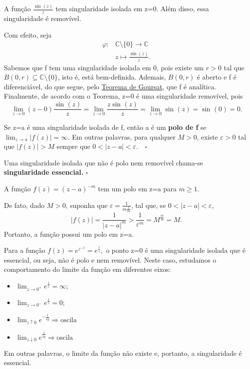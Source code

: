 \documentclass[ComplexAnalysis/complex.tex]{subfiles}
\begin{document}
\begin{example}
	A função \(\frac{\sin^{}{(z)}}{z}\) tem singularidade isolada em z=0. Além disso, essa singularidade é removível.

	Com efeito, seja
	\begin{align*}
		\varphi : & \mathbb{C}\setminus{\{0\}}\rightarrow \mathbb{C} \\
		          & z\mapsto \frac{\sin{(z)}}{z}.
	\end{align*}
	Sabemos que f tem uma singularidade isolada em 0, pois existe um \(r > 0\) tal que \(B(0, r)\subseteq \mathbb{C}\setminus{\{0\}}\), isto é, está bem-definida. Ademais, \(B(0, r)\) é aberto
	e f é diferenciável, do que segue, pelo \hyperlink{goursat}{Teorema de Goursat}, que f é analítica. Finalmente, de acordo com o Teorema, z=0 é uma singularidade removível, pois
	\[
		\lim_{z\to 0}(z-0)\frac{\sin^{}{(z)}}{z} = \lim_{z\to 0}\frac{z\sin^{}{(z)}}{z} = \lim_{z\to 0}\sin^{}{(z)} = \sin^{}{(0)} = 0.
	\]
\end{example}
\begin{def*}
	Se z=a é uma singularidade isolada de f, então a é um \textbf{polo de f} se \(\lim_{z\to a}|f(z)| = \infty.\) Em outras palavras,
	para qualquer \(M > 0\), existe \(\varepsilon > 0\) tal que \(|f(z)| > M\) sempre que \(0 < |z-a| < \varepsilon .\quad \square\)
\end{def*}
\begin{def*}
	Uma singularidade isolada que não é polo nem removível chama-se \textbf{singularidade essencial.} \(\square\)
\end{def*}
\begin{example}
	A função \(f(z) = (z-a)^{-m}\) tem um polo em z=a para \(m\geq 1\).

	De fato, dado \(M > 0\), suponha que \(\varepsilon  = \frac{1}{m \frac{1}{m}}\), tal que, se \(0 < |z-a| < \varepsilon ,\)
	\[
		|f(z)| = \frac{1}{|z-a|^{m}}> \frac{1}{\varepsilon ^{m}} = M^{\frac{m}{m}} = M.
	\]
	Portanto, a função possui um polo em z=a.
\end{example}
\begin{example}
	Para a função \(f(z) = e^{z^{-1}} = e^{\frac{1}{z}},\) o ponto z=0 é uma singularidade isolada que é essencial, ou seja, não é polo e nem removível. Neste caso, estudamos o comportamento do limite
	da função em diferentes eixos:
	\begin{itemize}
		\item \(\lim_{z\to 0^{+}}e^{\frac{1}{z}} = \infty\);
		\item \(\lim_{z\to 0^{-}}e^{\frac{1}{z}} = 0\);
		\item \(\lim_{z \uparrow 0}e^{-\frac{1}{iy}} \Rightarrow \text{oscila}\)
		\item \(\lim_{z \downarrow 0}e^{\frac{1}{iy}} \Rightarrow \text{oscila}\)
	\end{itemize}
	Em outras palavras, o limite da função não existe e, portanto, a singularidade é essencial.
\end{example}
\end{document}
